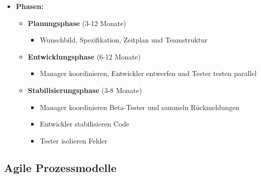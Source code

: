 \documentclass[parskip=full, 12pt]{scrartcl}
\begin{document}
\begin{itemize}
			\newpage
			\begin{itemize}			
				\item \textbf{Phasen:}
				\begin{itemize}
					\item \textbf{Planungsphase} (3-12 Monate)
					\begin{itemize}
						\item Wunschbild, Spezifikation, Zeitplan und Teamstruktur
					\end{itemize}
					\item \textbf{Entwicklungsphase} (6-12 Monate)
					\begin{itemize}
						\item Manager koordinieren, Entwickler entwerfen und Tester testen parallel
					\end{itemize}
					\item \textbf{Stabilisierungsphase} (3-8 Monate)
					\begin{itemize}
						\item Manager koordinieren Beta-Tester und sammeln Rückmeldungen
						\item Entwickler stabilisieren Code
						\item Tester isolieren Fehler
					\end{itemize}
				\end{itemize}
			\end{itemize}
		\end{itemize}
					
		\begin{center}
		\end{center}
	
		\subsection{Agile Prozessmodelle}
	
\end{document}
